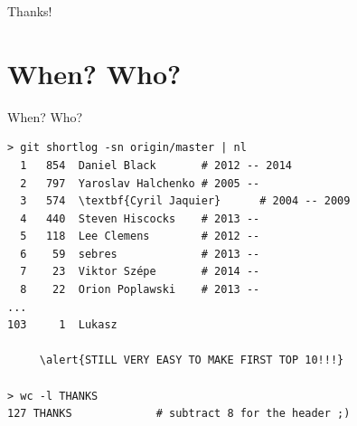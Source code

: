 \documentclass[]{beamer}
\begin{document}
\begin{frame}{}
\begin{center}
\Large Thanks!
\end{center}
\end{frame}

\appendix

\section{When? Who?}

\begin{frame}[fragile]{When? Who?}

\begin{Verbatim}[commandchars=\\\{\},fontsize=\small]
> git shortlog -sn origin/master | nl
  1   854  Daniel Black       # 2012 -- 2014
  2   797  Yaroslav Halchenko # 2005 --
  3   574  \textbf{Cyril Jaquier}      # 2004 -- 2009
  4   440  Steven Hiscocks    # 2013 --
  5   118  Lee Clemens        # 2012 --
  6    59  sebres             # 2013 --
  7    23  Viktor Szépe       # 2014 --
  8    22  Orion Poplawski    # 2013 --
...
103     1  Lukasz

     \alert{STILL VERY EASY TO MAKE FIRST TOP 10!!!}

> wc -l THANKS
127 THANKS             # subtract 8 for the header ;)
\end{Verbatim}
\end{frame}
\end{document}
